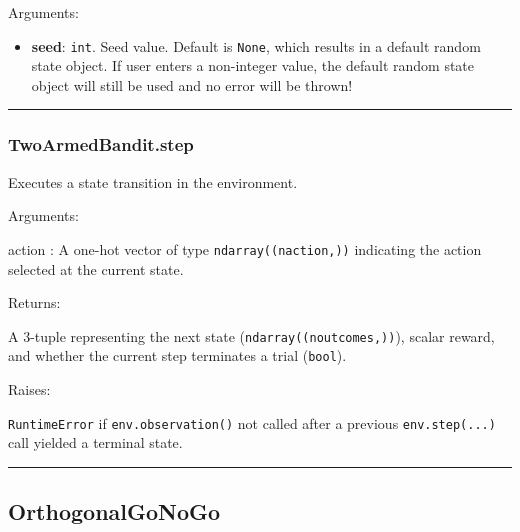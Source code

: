 Arguments:

\begin{itemize}
\tightlist
\item
  \textbf{seed}: \texttt{int}. Seed value. Default is \texttt{None},
  which results in a default random state object. If user enters a
  non-integer value, the default random state object will still be used
  and no error will be thrown!
\end{itemize}

\begin{center}\rule{0.5\linewidth}{\linethickness}\end{center}

\subsubsection{TwoArmedBandit.step}\label{twoarmedbandit.step}

\begin{Shaded}
\begin{Highlighting}[]
\end{Highlighting}
\end{Shaded}

Executes a state transition in the environment.

Arguments:

action : A one-hot vector of type \texttt{ndarray((naction,))}
indicating the action selected at the current state.

Returns:

A 3-tuple representing the next state (\texttt{ndarray((noutcomes,))}),
scalar reward, and whether the current step terminates a trial
(\texttt{bool}).

Raises:

\texttt{RuntimeError} if \texttt{env.observation()} not called after a
previous \texttt{env.step(...)} call yielded a terminal state.

\begin{center}\rule{0.5\linewidth}{\linethickness}\end{center}

\subsection{OrthogonalGoNoGo}\label{orthogonalgonogo}

\begin{Shaded}
\begin{Highlighting}[]
\end{Highlighting}
\end{Shaded}


